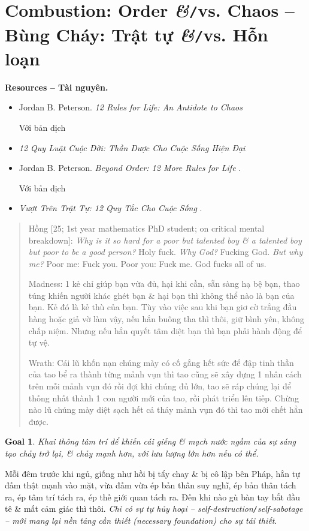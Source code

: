 \documentclass[12pt]{article}
\newtheorem{goal}{Goal}
\begin{document}
\section{Combustion: Order {\it\&}{\tt/}vs. Chaos -- Bùng Cháy: Trật tự {\it\&}{\tt/}vs. Hỗn loạn}
\noindent\textbf{\textsf{Resources -- Tài nguyên.}}
\begin{itemize}
	\item {\sc Jordan B. Peterson}. {\it 12 Rules for Life: An Antidote to Chaos} \cite{Peterson2018}
	
	Với bản dịch
	\item {\it 12 Quy Luật Cuộc Đời: Thần Dược Cho Cuộc Sống Hiện Đại} \cite{Peterson2022a}
	\item {\sc Jordan B. Peterson}. {\it Beyond Order: 12 More Rules for Life} \cite{Peterson2021}.
	
	Với bản dịch 
	\item {\it Vượt Trên Trật Tự: 12 Quy Tắc Cho Cuộc Sống} \cite{Peterson2022b}.
\end{itemize}

\begin{quote}
	{\sf Hồng [25; 1st year mathematics PhD student; on critical mental breakdown]}: {\it Why is it so hard for a poor but talented boy \& a talented boy but poor to be a good person?} Holy fuck. {\it Why God?} Fucking God. {\it But why me?} Poor me: Fuck you. Poor you: Fuck me. God fucks all of us.
	
	{\sf Madness}: 1 kẻ chỉ giúp bạn vừa đủ, hại khi cần, sẵn sàng hạ bệ bạn, thao túng khiến người khác ghét bạn \& hại bạn thì không thể nào là bạn của bạn. Kẻ đó là kẻ thù của bạn. Tùy vào việc sau khi bạn giơ cờ trắng đầu hàng hoặc giả vờ làm vậy, nếu hắn buông tha thì thôi, giữ bình yên, không chấp niệm. Nhưng nếu hắn quyết tâm diệt bạn thì bạn phải hành động để tự vệ.
	
	{\sf Wrath}: Cái lũ khốn nạn chúng mày có cố gắng hết sức để đập tinh thần của tao bể ra thành từng mảnh vụn thì tao cũng sẽ xây dựng 1 nhân cách trên mỗi mảnh vụn đó rồi đợi khi chúng đủ lớn, tao sẽ ráp chúng lại để thống nhất thành 1 con người mới của tao, rồi phát triển lên tiếp. Chừng nào lũ chúng mày diệt sạch hết cả thảy mảnh vụn đó thì tao mới chết hẳn được.
\end{quote}

\begin{goal}
	Khai thông tâm trí để khiến cái giếng \& mạch nước ngầm của sự sáng tạo chảy trở lại, \& chảy mạnh hơn, với lưu lượng lớn hơn nếu có thể.
\end{goal}
Mỗi đêm trước khi ngủ, giống như hồi bị tẩy chay \& bị cô lập bên Pháp, hắn tự đấm thật mạnh vào mặt, vừa đấm vừa ép bản thân suy nghĩ, ép bản thân tách ra, ép tâm trí tách ra, ép thế giới quan tách ra. Đến khi nào gù bàn tay bắt đầu tê \& mất cảm giác thì thôi. {\it Chỉ có sự tự hủy hoại -- self-destruction{\tt/}self-sabotage -- mới mang lại nền tảng cần thiết (necessary foundation) cho sự tái thiết}.
\end{document}

